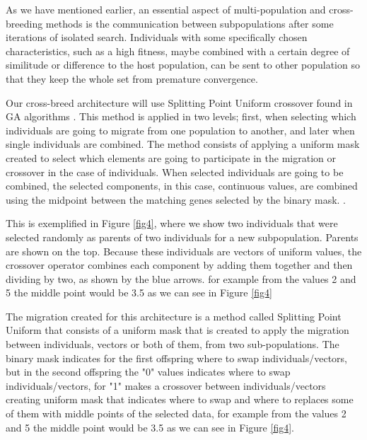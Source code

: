 \documentclass[runningheads]{llncs}
\begin{document}
As we have mentioned earlier, an essential aspect of multi-population
and cross-breeding methods is
the communication between subpopulations after some iterations of isolated
search. Individuals with some specifically chosen characteristics,
such as a high fitness, maybe combined with a certain degree of
similitude or difference to the host population, can be sent to other
population so that they keep the whole set from premature
convergence.

Our cross-breed architecture will use Splitting Point Uniform crossover found in GA
algorithms \cite{Kramer2014}. %
This method is applied in two levels; first, when selecting which
individuals are going to migrate from one population to another, and later when
single individuals are combined. The method consists of applying a uniform mask
created to select which elements are going to participate in the migration or
crossover in the case of individuals. When selected individuals are going to be
combined, the selected components, in this case, continuous values, are combined
using the midpoint between the matching genes selected by the binary mask.
\cite{Kramer2017,Kaya2011}.

This is exemplified in Figure \ref{fig4}, where we show
two individuals that were selected randomly as parents of two individuals for a
new subpopulation. Parents are shown on the top. Because these individuals are
vectors of uniform values, the crossover operator combines each component by
adding them together and then dividing by two, as shown by the blue arrows. 
for example from the values 
2 and 5 the middle point would be 3.5 as we can see in Figure \ref{fig4} 


The migration created for %
this architecture is a method called Splitting Point
Uniform that consists of a uniform mask that is created to apply the migration
between individuals, vectors or both of them, from two sub-populations. 
The binary mask indicates for the first offspring where to swap individuals/vectors, 
but in the second offspring the "0" values indicates where to swap individuals/vectors, for "1" 
 makes a crossover between individuals/vectors creating uniform mask that indicates where to swap and where to 
 replaces some of them with middle points of the selected data, for example from the values 
 2 and 5 the middle point would be 3.5 as we can see in Figure \ref{fig4}.
\end{document}
